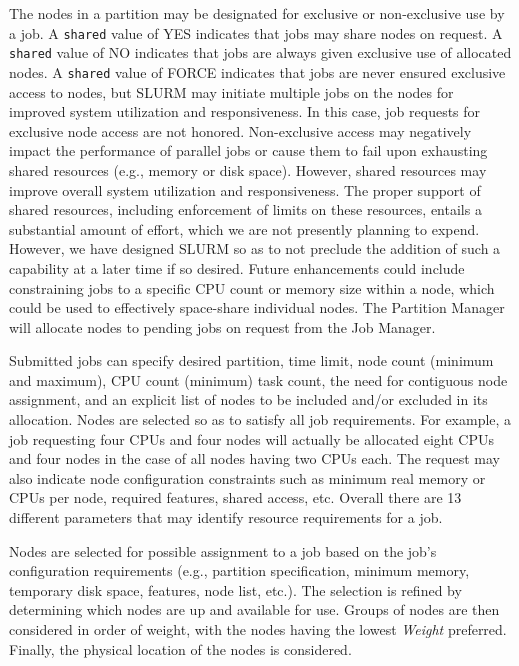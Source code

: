 \documentclass[10pt,onecolumn,times]{../common/llncs}
\begin{document}
{The nodes in a partition may be designated for exclusive or non-exclusive
use by a job.  A {\tt shared} value of YES indicates that jobs may
share nodes on request.  A {\tt shared} value of NO indicates that
jobs are always given exclusive use of allocated nodes.  A {\tt shared}
value of FORCE indicates that jobs are never ensured exclusive
access to nodes, but SLURM may initiate multiple jobs on the nodes
for improved system utilization and responsiveness.  In this case,
job requests for exclusive node access are not honored.  Non-exclusive
access may negatively impact the performance of parallel jobs or cause
them to fail upon exhausting shared resources (e.g., memory or disk
space). However, shared resources may improve overall system utilization
and responsiveness. The proper support of shared resources, including
enforcement of limits on these resources, entails a substantial amount of
effort, which we are not presently planning to expend.  However, we have
designed SLURM so as to not preclude the addition of such a capability
at a later time if so desired.  Future enhancements could include
constraining jobs to a specific CPU count or memory size within a
node, which could be used to effectively space-share individual nodes.
The Partition Manager will allocate nodes to pending jobs on request
from the Job Manager.

Submitted jobs can specify desired partition, time limit, node count
(minimum and maximum), CPU count (minimum) task count, the need for
contiguous node assignment, and an explicit list of nodes to be included
and/or excluded in its allocation.  Nodes are selected so as to satisfy
all job requirements.  For example, a job requesting four CPUs and four
nodes will actually be allocated eight CPUs and four nodes in the case
of all nodes having two CPUs each.  The request may also indicate node
configuration constraints such as minimum real memory or CPUs per node,
required features, shared access, etc.  Overall there are 13 different
parameters that may identify resource requirements for a job.

Nodes are selected for possible assignment to a job based on the
job's configuration requirements (e.g., partition specification, minimum
memory, temporary disk space, features, node list, etc.).  The selection
is refined by determining which nodes are up and available for use.
Groups of nodes are then considered in order of weight, with the nodes
having the lowest {\em Weight} preferred.  Finally, the physical location
of the nodes is considered.

}
\end{document}

